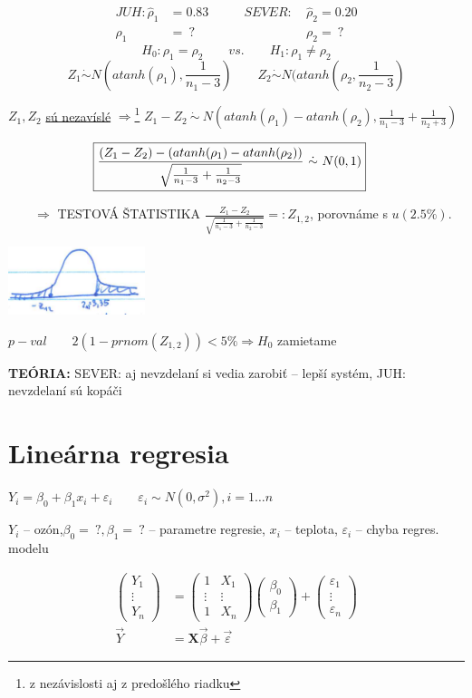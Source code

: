 \documentclass[unknownkeysallowed]{article}
\begin{document}
\begin{align*}
JUH: \hat{\rho}_1 &= 0.83 \qquad &SEVER:~ &\hat{\rho}_2 = 0.20 \\
\rho_1 &= ~? &\qquad &\rho_2 = ~?
\end{align*}
$$H_0: \rho_1 = \rho_2 \qquad vs. \qquad H_1: \rho_1 \neq \rho_2$$
$$Z_1 \dot{\sim} N(atanh(\rho_1), \frac{1}{n_1-3}) \qquad Z_2 \dot{\sim} N(atanh(\rho_2, \frac{1}{n_2-3})$$

$Z_1, Z_2$ \underline{sú nezavíslé} $\Rightarrow$\footnote{z nezávislosti aj z predošlého riadku} $Z_1-Z_2 ~\dot{\sim}~ N(atanh(\rho_1)-atanh(\rho_2), \frac{1}{n_1-3} + \frac{1}{n_2+3})$

\begin{align*}
\Aboxed{\frac{(Z_1-Z_2) - (atanh(\rho_1) - atanh(\rho_2))}{\sqrt{\frac{1}{n_1-3} + \frac{1}{n_2-3}}} ~\dot{\sim}~ N(0,1)}
\end{align*}

$\qquad \Rightarrow$ TESTOVÁ ŠTATISTIKA $\frac{Z_1 - Z_2}{\sqrt{\frac{1}{n_1-3}+\frac{1}{n_2-3}}} =: Z_{1,2}$, porovnáme s $u(2.5\%)$.

\includegraphics[width=0.3\textwidth]{imgs/obr26.png}

$p-val\qquad2(1-prnom(Z_{1,2})) < 5\% \Rightarrow H_0$ zamietame

\textbf{TEÓRIA:} SEVER: aj nevzdelaní si vedia zarobiť -- lepší systém, JUH: nevzdelaní sú kopáči

\section*{Lineárna regresia}
$Y_i = \beta_0 + \beta_1x_i + \varepsilon_i \qquad \varepsilon_i \sim N(0, \sigma^2), i = 1\ldots n$

$Y_i$ -- ozón,$\beta_0 = ~?, \beta_1 = ~?$ -- parametre regresie, $x_i$ -- teplota, $\varepsilon_i$ -- chyba regres. modelu

\begin{align*}
\left(\begin{matrix}
  Y_1\\
  \vdots\\
  Y_n
 \end{matrix}\right)
 &=
\left(\begin{matrix}
  1 & X_1\\
  \vdots & \vdots\\
  1 & X_n
 \end{matrix}\right) 
\left(\begin{matrix}
  \beta_0\\
  \beta_1
 \end{matrix}\right)  
 +
\left(\begin{matrix}
  \varepsilon_1\\
  \vdots\\
  \varepsilon_n
 \end{matrix}\right)\\
\vec{Y} &= \mathbf{X}\vec{\beta} + \vec{\varepsilon} 
\end{align*}
\end{document}
